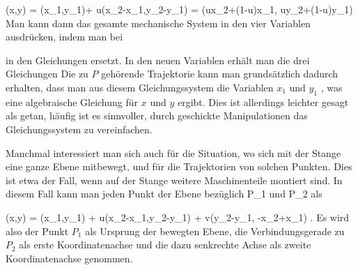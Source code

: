 {\mavergleichskettedisp
{\vergleichskette
{ (x,y)
}
{ =} { (x_1,y_1)+ u(x_2-x_1,y_2-y_1)
}
{ =} { (ux_2+(1-u)x_1, uy_2+(1-u)y_1)
}
{ } {
}
{ } {
}
}
{}{}{}
Man kann dann das gesamte mechanische System
 {} {}
in den vier Variablen
 ausdrücken, indem man  bei
 {} {}

 {  }

in den Gleichungen ersetzt. In den neuen Variablen erhält man die drei Gleichungen
Die zu $P$ gehörende Trajektorie kann man grundsätzlich dadurch erhalten, dass man aus diesem Gleichungssystem die Variablen $x_1$ und $y_1$ , was eine algebraische Gleichung für $x$ und $y$ ergibt. Dies ist allerdings leichter gesagt als getan, häufig ist es sinnvoller, durch geschickte Manipulationen das Gleichungssystem zu vereinfachen.





}

{}
{





Manchmal interessiert man sich auch für die Situation, wo sich mit der Stange eine ganze Ebene mitbewegt, und für die Trajektorien von solchen Punkten. Dies ist etwa der Fall, wenn auf der Stange weitere Maschinenteile montiert sind. In diesem Fall kann man jeden Punkt der Ebene bezüglich
\mathkor {} {P_1} {und} {P_2} {}
als

\mavergleichskettedisp
{\vergleichskette
{ (x,y)
}
{ =} { (x_1,y_1) + u(x_2-x_1,y_2-y_1) + v(y_2-y_1, -x_2+x_1)
}
{ } {
}
{ } {
}
{ } {
}
}
{}{}{.}
Es wird also der Punkt $P_1$ als Ursprung der bewegten Ebene, die Verbindungsgerade zu $P_2$ als erste Koordinatenachse und die dazu senkrechte Achse als zweite Koordinatenachse genommen.





}

